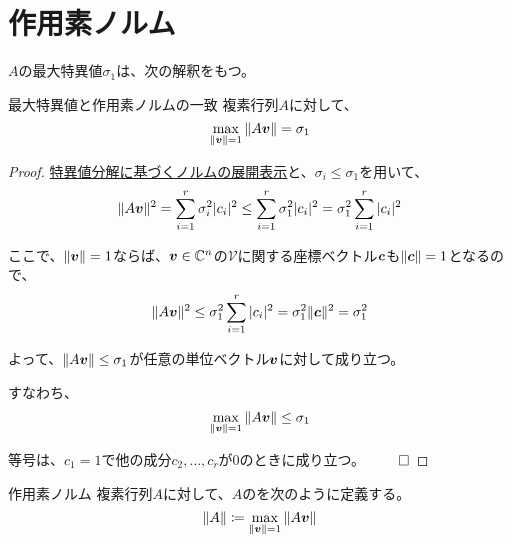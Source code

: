 \documentclass[../../../topic_linear-algebra]{subfiles}
\begin{document}
\sectionline
\section{作用素ノルム}

$A$の最大特異値$\sigma_1$は、次の解釈をもつ。

\begin{theorem}{最大特異値と作用素ノルムの一致}
  複素行列$A$に対して、
  \begin{equation*}
    \max_{\| \vb*{v} \| = 1}{\| A \vb*{v} \|} = \sigma_1
  \end{equation*}
\end{theorem}

\begin{proof}
  \hyperref[thm:norm-expansion-svd]{特異値分解に基づくノルムの展開表示}と、$\sigma_i \leq \sigma_1$を用いて、
  \begin{equation*}
    \| A \vb*{v} \|^2 = \sum_{i=1}^r \sigma_i^2 |c_i|^2 \leq \sum_{i=1}^r \sigma_1^2 |c_i|^2 = \sigma_1^2 \sum_{i=1}^r |c_i|^2
  \end{equation*}
  
  ここで、$\| \vb*{v} \| = 1$ならば、$\vb*{v} \in \mathbb{C}^n$の$\mathcal{V}$に関する座標ベクトル$\vb*{c}$も$\| \vb*{c} \| = 1$となるので、
  \begin{equation*}
    \| A \vb*{v} \|^2 \leq \sigma_1^2 \sum_{i=1}^r |c_i|^2 = \sigma_1^2 \| \vb*{c} \|^2 = \sigma_1^2
  \end{equation*}
  
  よって、$\| A \vb*{v} \| \leq \sigma_1$が任意の単位ベクトル$\vb*{v}$に対して成り立つ。
  
  すなわち、
  \begin{equation*}
    \max_{\| \vb*{v} \| = 1} \| A \vb*{v} \| \leq \sigma_1
  \end{equation*}
  
  等号は、$c_1 = 1$で他の成分$c_2, \dots, c_r$が0のときに成り立つ。 $\qed$
\end{proof}

\br

\begin{definition}{作用素ノルム}
  複素行列$A$に対して、$A$のを次のように定義する。
  \begin{equation*}
    \| A \| \coloneq \max_{\| \vb*{v} \| = 1} \| A \vb*{v} \|
  \end{equation*}
\end{definition}
\end{document}

